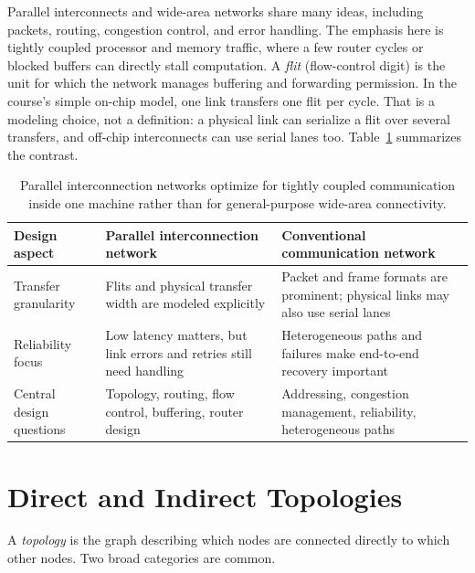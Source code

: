 Parallel interconnects and wide-area networks share many ideas, including packets, routing, congestion control, and error handling.
The emphasis here is tightly coupled processor and memory traffic, where a few router cycles or blocked buffers can directly stall computation.
A \textit{flit} (flow-control digit) is the unit for which the network manages buffering and forwarding permission.
In the course's simple on-chip model, one link transfers one flit per cycle.
That is a modeling choice, not a definition: a physical link can serialize a flit over several transfers, and off-chip interconnects can use serial lanes too.
Table~\ref{tab:pin-vs-comm} summarizes the contrast.
\begin{table}[!b]
    \centering
    \footnotesize
    \renewcommand{\arraystretch}{1.15}
    \begin{tabular}{|>{\raggedright\arraybackslash}p{1.20in}|>{\raggedright\arraybackslash}p{2.05in}|>{\raggedright\arraybackslash}p{2.20in}|}
        \hline
        Design aspect            & Parallel interconnection network                                          & Conventional communication network                                  \\
        \hline
        Transfer granularity & Flits and physical transfer width are modeled explicitly & Packet and frame formats are prominent; physical links may also use serial lanes \\
        \hline
        Reliability focus & Low latency matters, but link errors and retries still need handling & Heterogeneous paths and failures make end-to-end recovery important \\
        \hline
        Central design questions & Topology, routing, flow control, buffering, router design & Addressing, congestion management, reliability, heterogeneous paths \\
        \hline
    \end{tabular}
    \caption{Parallel interconnection networks optimize for tightly coupled communication inside one machine rather than for general-purpose wide-area connectivity.}
    \label{tab:pin-vs-comm}
\end{table}


\section{Direct and Indirect Topologies}\label{sec:pin-direct-vs-indirect}
A \textit{topology} is the graph describing which nodes are connected directly to which other nodes.
Two broad categories are common.

